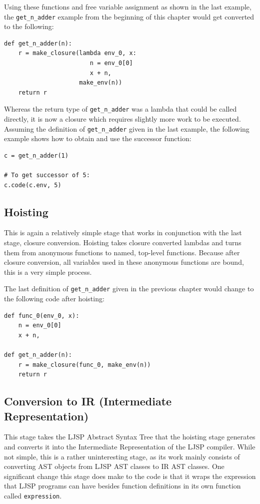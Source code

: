 \documentclass[11pt]{report}
\begin{document}
Using these functions and free variable assignment as shown in the last example, the \texttt{get_n_adder} example from the beginning of this chapter would get converted to the following:

\begin{lstlisting}
def get_n_adder(n):
    r = make_closure(lambda env_0, x: 
                        n = env_0[0]
                        x + n, 
                     make_env(n))
    return r
\end{lstlisting}

Whereas the return type of \texttt{get_n_adder} was a lambda that could be called directly, it is now a closure which requires slightly more work to be executed. Assuming the definition of \texttt{get_n_adder} given in the last example, the following example shows how to obtain and use the successor function:

\begin{lstlisting}
c = get_n_adder(1)

# To get successor of 5:
c.code(c.env, 5)
\end{lstlisting}

\subsection{Hoisting}
This is again a relatively simple stage that works in conjunction with the last stage, closure conversion. Hoisting takes closure converted lambdas and turns them from anonymous functions to named, top-level functions. Because after closure conversion, all variables used in these anonymous functions are bound, this is a very simple process.

The last definition of \texttt{get_n_adder} given in the previous chapter would change to the following code after hoisting:

\begin{lstlisting}
def func_0(env_0, x):
    n = env_0[0]
    x + n, 
    
def get_n_adder(n):
    r = make_closure(func_0, make_env(n))
    return r
\end{lstlisting}

\subsection{Conversion to IR (Intermediate Representation)}
This stage takes the LJSP Abstract Syntax Tree that the hoisting stage generates and converts it into the Intermediate Representation of the LJSP compiler. While not simple, this is a rather uninteresting stage, as its work mainly consists of converting AST objects from LJSP AST classes to IR AST classes. One significant change this stage does make to the code is that it wraps the expression that LJSP programs can have besides function definitions in its own function called \texttt{expression}.
\end{document}
